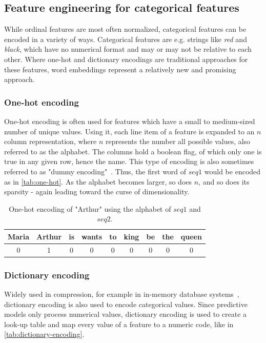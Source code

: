 \subsection{Feature engineering for categorical features}
\label{sec:categorical-feature-engineering}
While ordinal features are most often normalized, categorical features can be encoded in a variety of ways. Categorical features are e.g. strings like \textit{red} and \textit{black}, which have no numerical format and may or may not be relative to each other. Where one-hot and dictionary encodings are traditional approaches for these features, word embeddings represent a relatively new and promising approach.

\subsubsection*{One-hot encoding}
One-hot encoding is often used for features which have a small to medium-sized number of unique values. Using it, each line item of a feature is expanded to an $n$ column representation, where $n$ represents the number all possible values, also referred to as the alphabet. The columns hold a boolean flag, of which only one is true in any given row, hence the name. This type of encoding is also sometimes referred to as "dummy encoding"~\cite{web:pandas-get-dummies}. Thus, the first word of $seq1$ would be encoded as in \autoref{tab:one-hot}. As the alphabet becomes larger, so does $n$, and so does its sparsity - again leading toward the curse of dimensionality.

\begin{table}[ht]
    \centering
    \begin{tabular}{c|c|c|c|c|c|c|c|c}
        Maria & Arthur & is & wants & to & king & be & the & queen\\
        \hline
        0 & 1 & 0 & 0 & 0 & 0 & 0 & 0 & 0\\
    \end{tabular}
    \caption{One-hot encoding of "Arthur" using the alphabet of $seq1$ and $seq2$.}
    \label{tab:one-hot}
\end{table}

\subsubsection*{Dictionary encoding}
Widely used in compression, for example in in-memory database systems~\cite{plattner2012memory}, dictionary encoding is also used to encode categorical values. Since predictive models only process numerical values, dictionary encoding is used to create a look-up table and map every value of a feature to a numeric code, like in \autoref{tab:dictionary-encoding}.

